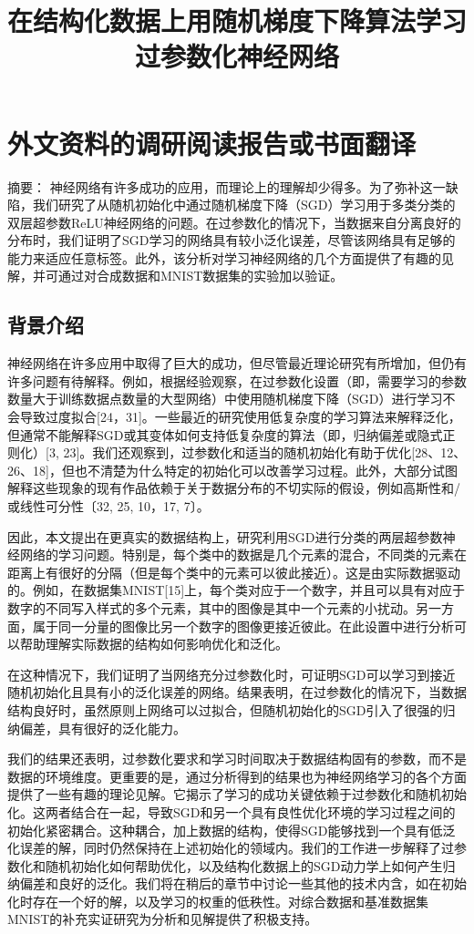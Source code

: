 \chapter{外文资料的调研阅读报告或书面翻译}

\title{在结构化数据上用随机梯度下降算法学习过参数化神经网络\cite{li2018learning}}

{\heiti 摘要：} 神经网络有许多成功的应用，而理论上的理解却少得多。为了弥补这一缺陷，我们研究了从随机初始化中通过随机梯度下降（SGD）学习用于多类分类的双层超参数ReLU神经网络的问题。在过参数化的情况下，当数据来自分离良好的分布时，我们证明了SGD学习的网络具有较小泛化误差，尽管该网络具有足够的能力来适应任意标签。此外，该分析对学习神经网络的几个方面提供了有趣的见解，并可通过对合成数据和MNIST数据集的实验加以验证。

\section{背景介绍}
神经网络在许多应用中取得了巨大的成功，但尽管最近理论研究有所增加，但仍有许多问题有待解释。例如，根据经验观察，在过参数化设置（即，需要学习的参数数量大于训练数据点数量的大型网络）中使用随机梯度下降（SGD）进行学习不会导致过度拟合[24，31]。一些最近的研究使用低复杂度的学习算法来解释泛化，但通常不能解释SGD或其变体如何支持低复杂度的算法（即，归纳偏差或隐式正则化）[3, 23]。我们还观察到，过参数化和适当的随机初始化有助于优化[28、12、26、18]，但也不清楚为什么特定的初始化可以改善学习过程。此外，大部分试图解释这些现象的现有作品依赖于关于数据分布的不切实际的假设，例如高斯性和/或线性可分性〔32, 25, 10，17, 7〕。
\par
因此，本文提出在更真实的数据结构上，研究利用SGD进行分类的两层超参数神经网络的学习问题。特别是，每个类中的数据是几个元素的混合，不同类的元素在距离上有很好的分隔（但是每个类中的元素可以彼此接近）。这是由实际数据驱动的。例如，在数据集MNIST[15]上，每个类对应于一个数字，并且可以具有对应于数字的不同写入样式的多个元素，其中的图像是其中一个元素的小扰动。另一方面，属于同一分量的图像比另一个数字的图像更接近彼此。在此设置中进行分析可以帮助理解实际数据的结构如何影响优化和泛化。
\par
在这种情况下，我们证明了当网络充分过参数化时，可证明SGD可以学习到接近随机初始化且具有小的泛化误差的网络。结果表明，在过参数化的情况下，当数据结构良好时，虽然原则上网络可以过拟合，但随机初始化的SGD引入了很强的归纳偏差，具有很好的泛化能力。
\par
我们的结果还表明，过参数化要求和学习时间取决于数据结构固有的参数，而不是数据的环境维度。更重要的是，通过分析得到的结果也为神经网络学习的各个方面提供了一些有趣的理论见解。它揭示了学习的成功关键依赖于过参数化和随机初始化。这两者结合在一起，导致SGD和另一个具有良性优化环境的学习过程之间的初始化紧密耦合。这种耦合，加上数据的结构，使得SGD能够找到一个具有低泛化误差的解，同时仍然保持在上述初始化的领域内。我们的工作进一步解释了过参数化和随机初始化如何帮助优化，以及结构化数据上的SGD动力学上如何产生归纳偏差和良好的泛化。我们将在稍后的章节中讨论一些其他的技术内含，如在初始化时存在一个好的解，以及学习的权重的低秩性。对综合数据和基准数据集MNIST的补充实证研究为分析和见解提供了积极支持。

